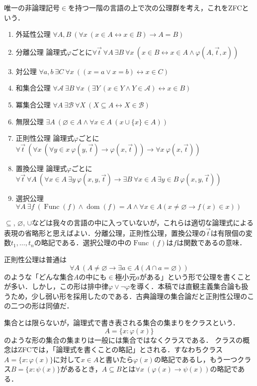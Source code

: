\documentclass[uplatex,dvipdfmx]{jsarticle}
\newcommand{\dom}{\operatorname{dom}}
\newcommand{\Func}{\operatorname{Func}}
\renewcommand\emptyset{\varnothing}
\renewcommand\subset{\subseteq}
\theoremstyle{definition}
\begin{document}
唯一の非論理記号$\in$を持つ一階の言語の上で次の公理群を考え，これをZFCという．

\begin{enumerate}
    \item 外延性公理 $\forall A, B\ (\forall x\ (x \in A \leftrightarrow x \in B) \to A = B)$
    \item 分離公理 論理式$\varphi$ごとに$\forall \vec{t}\ \forall A\ \exists B\ \forall x\ (x \in B \leftrightarrow x \in A \land \varphi(A, \vec{t}, x))$
    \item 対公理 $\forall a, b\ \exists C\ \forall x\ ((x = a \lor x = b) \leftrightarrow x \in C)$
    \item 和集合公理 $\forall \mathcal{A}\ \exists B\ \forall x\ (\exists Y\ (x \in Y \land Y \in \mathcal{A}) \leftrightarrow x \in B)$
    \item 冪集合公理 $\forall A\ \exists \mathcal{B}\ \forall X\ (X \subset A \leftrightarrow X \in \mathcal{B})$
    \item 無限公理 $\exists A\ (\emptyset \in A \land \forall x \in A\ (x \cup \{x\} \in A))$
    \item 正則性公理 論理式$\varphi$ごとに$\forall \vec{t}\ (\forall x\ (\forall y \in x\ \varphi(y, \vec{t}) \to \varphi(x, \vec{t})) \to \forall x\ \varphi(x, \vec{t}))$
    \item 置換公理 論理式$\varphi$ごとに$\forall \vec{t}\ \forall A\ (\forall x\in A\ \exists y\ \varphi(x, y, \vec{t}) \to \exists B\ \forall x \in A\ \exists y\in B\ \varphi(x, y, \vec{t}))$
    \item 選択公理 $\forall A\ \exists f\ (\Func(f) \land \dom(f) = A \land \forall x \in A (x \ne \emptyset \to f(x) \in x))$
\end{enumerate}

$\subset$, $\emptyset$, $\cup$などは我々の言語の中に入っていないが，これらは適切な論理式による表現の省略形と思えばよい．分離公理，正則性公理，置換公理の$\vec{t}$は有限個の変数$t_1, \dots, t_n$の略記である．選択公理の中の$\Func(f)$は$f$は関数であるの意味．

正則性公理は普通は
\[
\forall A\ (A \ne \emptyset \to \exists a \in A (A \cap a = \emptyset))
\]
のような「どんな集合$A$の中にも$\in$極小元$a$がある」という形で公理を書くことが多い．しかし，この形は排中律$\varphi \lor \neg \varphi$を導く．本稿では直観主義集合論も扱うため，少し弱い形を採用したのである．古典論理の集合論だと正則性公理のこの二つの形は同値だ．

集合とは限らないが，論理式で書き表される集合の集まりをクラスという．
\[
A = \{ x : \varphi(x) \}
\]
のような形の集合の集まりは一般には集合ではなくクラスである．
クラスの概念はZFCでは，「論理式を書くことの略記」とされる．すなわちクラス$A = \{ x : \varphi(x) \}$に対して$x \in A$と書いたら$\varphi(x)$の略記であるし，もう一つクラス$B = \{ x : \psi(x) \}$があるとき，$A \subset B$とは$\forall x\ (\varphi(x) \to \psi(x))$の略記である．
\end{document}
